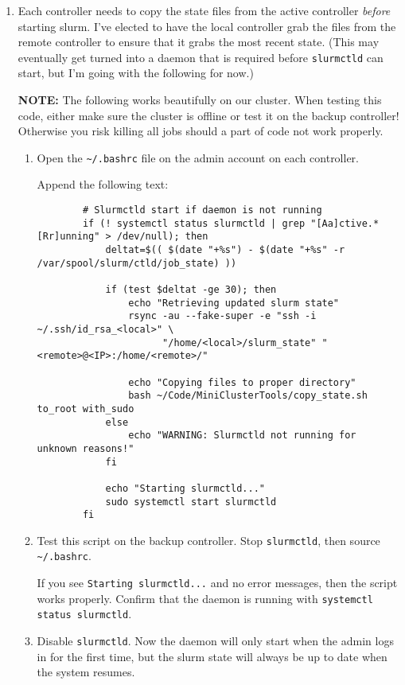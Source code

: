 \begin{enumerate}
  \item Each controller needs to copy the state files from the active controller \emph{before} starting slurm. I've elected to have the local controller grab the files from the remote controller to ensure that it grabs the most recent state. (This may eventually get turned into a daemon that is required before \texttt{slurmctld} can start, but I'm going with the following for now.) 

    \textbf{NOTE:} The following works beautifully on our cluster. When testing this code, either make sure the cluster is offline or test it on the backup controller! Otherwise you risk killing all jobs should a part of code not work properly.

    \begin{enumerate}
      \item Open the \texttt{\textasciitilde /.bashrc} file on the admin account on each controller.

        Append the following text:
		\begin{verbatim}
		# Slurmctld start if daemon is not running
		if (! systemctl status slurmctld | grep "[Aa]ctive.*[Rr]unning" > /dev/null); then
		    deltat=$(( $(date "+%s") - $(date "+%s" -r /var/spool/slurm/ctld/job_state) ))

		    if (test $deltat -ge 30); then
		        echo "Retrieving updated slurm state"
		        rsync -au --fake-super -e "ssh -i ~/.ssh/id_rsa_<local>" \
		              "/home/<local>/slurm_state" "<remote>@<IP>:/home/<remote>/"

		        echo "Copying files to proper directory"
		        bash ~/Code/MiniClusterTools/copy_state.sh to_root with_sudo
		    else
		        echo "WARNING: Slurmctld not running for unknown reasons!"
		    fi

		    echo "Starting slurmctld..."
		    sudo systemctl start slurmctld
		fi
		\end{verbatim}

      \item Test this script on the backup controller. Stop \texttt{slurmctld}, then source \texttt{\textasciitilde /.bashrc}.	

        If you see \texttt{Starting slurmctld...} and no error messages, then the script works properly. Confirm that the daemon is running with \texttt{systemctl status slurmctld}.

      \item Disable \texttt{slurmctld}. Now the daemon will only start when the admin logs in for the first time, but the slurm state will always be up to date when the system resumes.
    \end{enumerate}


\end{enumerate}
